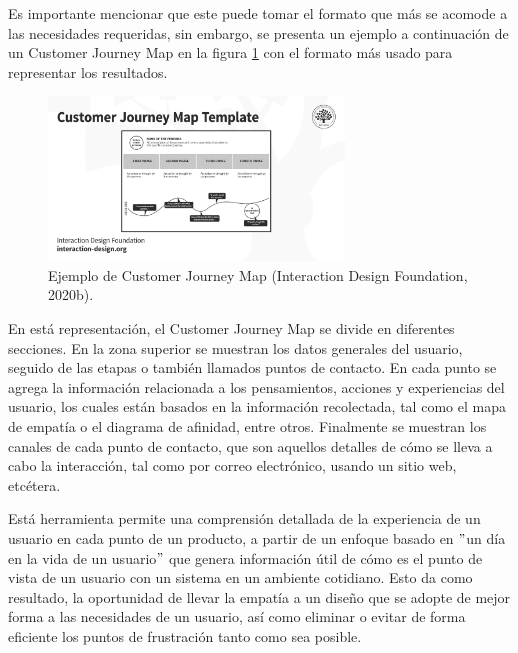 Es importante mencionar que este puede tomar el formato que más se acomode a las necesidades requeridas, sin embargo, se presenta un ejemplo a continuación de un Customer Journey Map en la figura \ref{fig:35} con el formato más usado para representar los resultados.

\begin{figure}
  \centering
  \includegraphics[width=0.70\textwidth]{Cap3/Figuras/CustomerJourneyMapEjemplo.png}
  \caption{Ejemplo de Customer Journey Map (Interaction Design Foundation, 2020b).}
  \label{fig:35}
\end{figure}

En está representación, el Customer Journey Map se divide en diferentes secciones. En la zona superior se muestran los datos generales del usuario, seguido de las etapas o también llamados puntos de contacto. En cada punto se agrega la información relacionada a los pensamientos, acciones y experiencias del usuario, los cuales están basados en la información recolectada, tal como el mapa de empatía o el diagrama de afinidad, entre otros. Finalmente se muestran los canales de cada punto de contacto, que son aquellos detalles de cómo se lleva a cabo la interacción, tal como por correo electrónico, usando un sitio web, etcétera.

Está herramienta permite una comprensión detallada de la experiencia de un usuario en cada punto de un producto, a partir de un enfoque basado en $"$un día en la vida de un usuario$"$ que genera información útil de cómo es el punto de vista de un usuario con un sistema en un ambiente cotidiano. Esto da como resultado, la oportunidad de llevar la empatía a un diseño que se adopte de mejor forma a las necesidades de un usuario, así como eliminar o evitar de forma eficiente los puntos de frustración tanto como sea posible.


